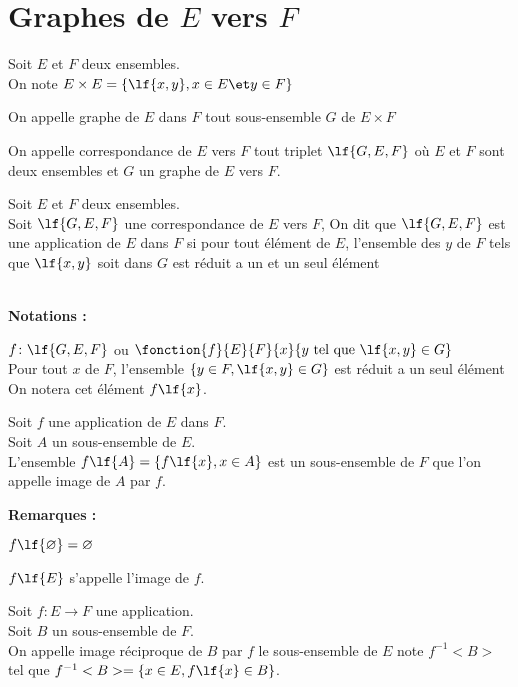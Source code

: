 \documentclass[12pt,twoside,a4paper]{article}
\author{MPSI 2}
\begin{document}
	\maketitle
	\section{Graphes de $E$ vers $F$}
		Soit $E$ et $F$ deux ensembles. \\
		On note $E\times E=\{\lf{x,y},x\in E\et y\in F\}$
		\begin{defi}
			On appelle graphe de $E$ dans $F$ tout sous-ensemble $G$ de $E\times F$
		\end{defi}
		\begin{defi}
			On appelle correspondance de $E$ vers $F$ tout triplet $\lf{G,E,F}$ o\`u $E$ et $F$ sont deux ensembles et $G$ un graphe de $E$ vers $F$.
		\end{defi}
		\begin{defi}
			Soit $E$ et $F$ deux ensembles. \\
			Soit $\lf{G,E,F}$ une correspondance de $E$ vers $F$, On dit que $\lf{G,E,F}$ est une application de $E$ dans $F$ si pour tout \'el\'ement de $E$, l'ensemble des $y$ de $F$ tels que $\lf{x,y}$ soit dans $G$ est r\'eduit a un et un seul \'el\'ement
		\end{defi}\ \\
		\textbf{Notations :}
		\begin{tab}
			$f\colon\lf{G,E,F}$ ou $\fonction{f}{E}{F}{x}{y\text{ tel que }\lf{x,y}\in G}$  \\
			Pour tout $x$ de $F$, l'ensemble $\{y\in F,\lf{x,y}\in G\}$ est r\'eduit a un seul \'el\'ement On notera cet \'el\'ement $f\lf{x}$.
		\end{tab}
		\begin{defi}
			Soit $f$ une application de $E$ dans $F$. \\
			Soit $A$ un sous-ensemble de $E$. \\
			L'ensemble $f\lf{A}=\{f\lf{x},x\in A\}$ est un sous-ensemble de $F$ que l'on appelle image de $A$ par $f$.
		\end{defi}\newpage
		\textbf{Remarques :}
		\begin{liste}
			\item $f\lf{\varnothing}=\varnothing$
			\item $f\lf{E}$ s'appelle l'image de $f$.
		\end{liste}
		\begin{defi}
			Soit $f\colon E\longrightarrow F$ une application. \\
			Soit $B$ un sous-ensemble de $F$. \\
			On appelle image r\'eciproque de $B$ par $f$ le sous-ensemble de $E$ note $f^{-1}<B>$ tel que $f^{-1}<B>=\{x\in E,f\lf{x}\in B\}$.
		\end{defi}\ \\
\end{document}
